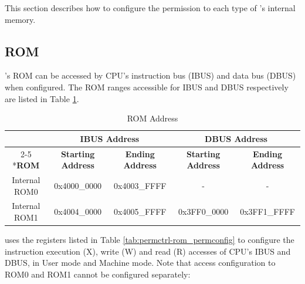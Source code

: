 \documentclass[main\_\_EN.tex]{subfiles}
\begin{document}
This section describes how to configure the permission to each type of \chipname{}'s internal memory.

\subsection{ROM}\label{sec:permctrl-PC-for-ROM}

\chipname{}'s ROM can be accessed by CPU's instruction bus (IBUS) and data bus (DBUS) when configured. The ROM ranges accessible for IBUS and DBUS respectively are listed in Table  \ref{tab:permctrl-ROM_block_address}.

\begin{table}[H]
    \centering
    \caption{ROM Address}
    \label{tab:permctrl-ROM_block_address}

    \begin{tabular}{|*{5}{c|} }
    \hline
        \rowcolor{lightgray}
         & \multicolumn{2}{c|}{\textbf{IBUS Address}} & \multicolumn{2}{c|}{\textbf{DBUS Address}} \\\cline{2-5}
        \rowcolor{lightgray}
        \multirow{-2}*{\textbf{ROM}} & \textbf{Starting Address} & \textbf{Ending Address} & \textbf{Starting Address} & \textbf{Ending Address} \\\hline

        Internal ROM0  & 0x4000\_0000 & 0x4003\_FFFF & - & - \\\hline
        Internal ROM1  & 0x4004\_0000 & 0x4005\_FFFF & 0x3FF0\_0000 & 0x3FF1\_FFFF \\\hline
        \end{tabular}
    \end{table}


\chipname{} uses the registers listed in Table  \ref{tab:permctrl-rom_permconfig} to configure the instruction execution (X), write (W) and read (R) accesses of CPU's IBUS and DBUS, in User mode and Machine mode. Note that access configuration to ROM0 and ROM1 cannot be configured separately:
\end{document}
